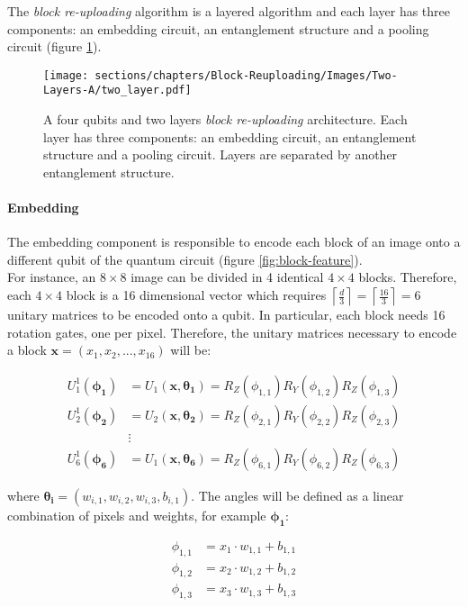 The \textit{block re-uploading} algorithm is a layered algorithm and each layer has three components: 
an embedding circuit, an entanglement structure and a pooling circuit (figure \ref{fig:components}).

\begin{figure}[h]
    \centering
    \texttt{[image: sections/chapters/Block-Reuploading/Images/Two-Layers-A/two\_layer.pdf]}
    \caption{A four qubits and two layers \textit{block re-uploading} architecture. Each layer has three 
    components: an embedding circuit, an entanglement structure and a pooling circuit.
    Layers are separated by another entanglement structure.}
    \label{fig:components}
\end{figure}

\paragraph{Embedding}
The embedding component is responsible to encode each block of an image onto a different qubit of 
the quantum circuit (figure \ref{fig:block-feature}).\\
For instance, an $8\times8$ image can be divided in 4 identical $4\times4$ blocks. 
Therefore, each $4\times4$ block is a 16 dimensional vector which requires 
$\left\lceil \frac{d}{3} \right\rceil = \left\lceil \frac{16}{3} \right\rceil = 6$ unitary matrices 
to be encoded onto a qubit.
In particular, each block needs 16 rotation gates, one per pixel.
Therefore, the unitary matrices necessary to encode a block $\bm{x} = (x_1, x_2, ..., x_{16})$ will be:

\begin{align}
    U^1_1(\bm{\phi_1}) &= U_1(\bm{x}, \bm{\theta_1}) = R_Z(\phi_{1,1}) R_Y(\phi_{1,2}) R_Z(\phi_{1,3}) \\
    U^1_2(\bm{\phi_2}) &= U_2(\bm{x}, \bm{\theta_2}) = R_Z(\phi_{2,1}) R_Y(\phi_{2,2}) R_Z(\phi_{2,3}) \\
    &\vdots \\
    U^1_6(\bm{\phi_6}) &= U_1(\bm{x}, \bm{\theta_6}) = R_Z(\phi_{6,1}) R_Y(\phi_{6,2}) R_Z(\phi_{6,3}) 
\end{align}

where $\bm{\theta_i} = (w_{i,1}, w_{i,2}, w_{i,3}, b_{i,1})$.
The angles will be defined as a linear combination of pixels and weights, for example $\bm{\phi_1}$:

\begin{align}
    \phi_{1,1} &= x_1 \cdot w_{1,1} + b_{1,1} \\
    \phi_{1,2} &= x_2 \cdot w_{1,2} + b_{1,2} \\
    \phi_{1,3} &= x_3 \cdot w_{1,3} + b_{1,3} \\
\end{align}


